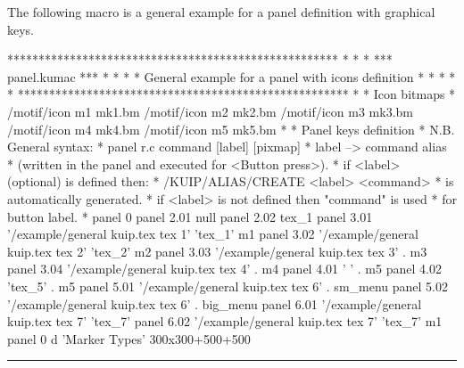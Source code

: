 The following \KUIP{} macro is a general example for a panel
definition with graphical keys.
\begin{XMP}
*****************************************************
*                                                   *
*             *** panel.kumac ***                   *
*                                                   *
* General example for a panel with icons definition *
*                                                   *
*                                                   *
*****************************************************
*
* Icon bitmaps
*
/motif/icon m1 mk1.bm
/motif/icon m2 mk2.bm
/motif/icon m3 mk3.bm
/motif/icon m4 mk4.bm
/motif/icon m5 mk5.bm
*
* Panel keys definition
* N.B. General syntax:
*      panel r.c command [label] [pixmap]
*      label --> command alias
*                (written in the panel and executed for <Button press>).
*                if <label> (optional) is defined then:
*                   /KUIP/ALIAS/CREATE <label> <command>
*                is automatically generated.
*                if <label> is not defined then "command" is used
*                for button label.
*
panel 0
panel 2.01 null
panel 2.02 tex_1
panel 3.01 '/example/general kuip.tex tex 1' 'tex_1' m1
panel 3.02 '/example/general kuip.tex tex 2' 'tex_2' m2
panel 3.03 '/example/general kuip.tex tex 3' . m3
panel 3.04 '/example/general kuip.tex tex 4' . m4
panel 4.01 ' ' . m5
panel 4.02 'tex_5' . m5
panel 5.01 '/example/general kuip.tex tex 6' . sm_menu
panel 5.02 '/example/general kuip.tex tex 6' . big_menu
panel 6.01 '/example/general kuip.tex tex 7' 'tex_7'
panel 6.02 '/example/general kuip.tex tex 7' 'tex_7' m1
panel 0 d 'Marker Types' 300x300+500+500
\end{XMP}
\hrule
 
